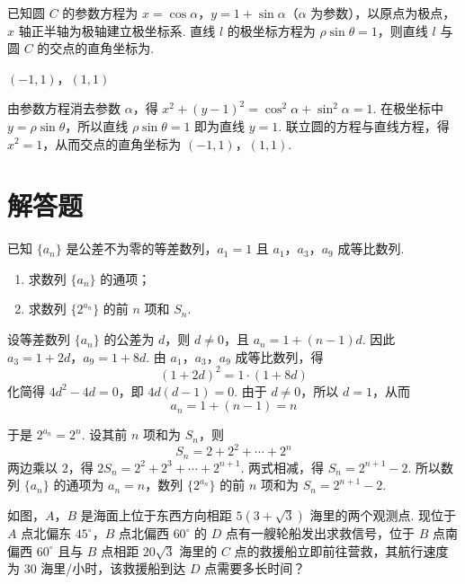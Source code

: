 \reuseproblemnumber
\begin{problem}[C]
已知圆 \(C\) 的参数方程为 \(x = \cos \alpha\)，\(y = 1 + \sin \alpha\)（\(\alpha\) 为参数），以原点为极点，\(x\) 轴正半轴为极轴建立极坐标系. 直线 \(l\) 的极坐标方程为 \(\rho\sin\theta = 1\)，则直线 \(l\) 与圆 \(C\) 的交点的直角坐标为\fillinblank{}.
\end{problem}

\begin{answer}
\((-1,1)\)，\((1,1)\)
\end{answer}

\begin{solution}
由参数方程消去参数 \(\alpha\)，得 \(x^2+(y-1)^2=\cos^2\alpha+\sin^2\alpha=1\). 在极坐标中 \(y=\rho\sin\theta\)，所以直线 \(\rho\sin\theta=1\) 即为直线 \(y=1\). 联立圆的方程与直线方程，得 \(x^2=1\)，从而交点的直角坐标为 \((-1,1)\)，\((1,1)\).
\end{solution}

\section{解答题}

\begin{problem}
已知 \(\{a_n\}\) 是公差不为零的等差数列，\(a_1 = 1\) 且 \(a_1\)，\(a_3\)，\(a_9\) 成等比数列.

\begin{enumerate}
\item 求数列 \(\{a_n\}\) 的通项；
\item 求数列 \(\{2^{a_n}\}\) 的前 \(n\) 项和 \(S_n\).
\end{enumerate}
\end{problem}

\begin{solution}
设等差数列 \(\{a_n\}\) 的公差为 \(d\)，则 \(d\ne0\)，且 \(a_n=1+(n-1)d\). 因此 \(a_3=1+2d\)，\(a_9=1+8d\). 由 \(a_1\)，\(a_3\)，\(a_9\) 成等比数列，得
\[
(1+2d)^2=1\cdot(1+8d)
\]
化简得 \(4d^2-4d=0\)，即 \(4d(d-1)=0\). 由于 \(d\ne0\)，所以 \(d=1\)，从而
\[
a_n=1+(n-1)=n
\]

于是 \(2^{a_n}=2^n\). 设其前 \(n\) 项和为 \(S_n\)，则
\[
S_n=2+2^2+\cdots+2^n
\]
两边乘以 \(2\)，得 \(2S_n=2^2+2^3+\cdots+2^{n+1}\). 两式相减，得 \(S_n=2^{n+1}-2\).
所以数列 \(\{a_n\}\) 的通项为 \(a_n=n\)，数列 \(\{2^{a_n}\}\) 的前 \(n\) 项和为 \(S_n=2^{n+1}-2\).
\end{solution}

\begin{problem}
如图，\(A\)，\(B\) 是海面上位于东西方向相距 \(5(3 + \sqrt{3})\) 海里的两个观测点. 现位于 \(A\) 点北偏东 \(45^\circ\)，\(B\) 点北偏西 \(60^\circ\) 的 \(D\) 点有一艘轮船发出求救信号，位于 \(B\) 点南偏西 \(60^\circ\) 且与 \(B\) 点相距 \(20\sqrt{3}\) 海里的 \(C\) 点的救援船立即前往营救，其航行速度为 \(30\) 海里/小时，该救援船到达 \(D\) 点需要多长时间？

\end{problem}

